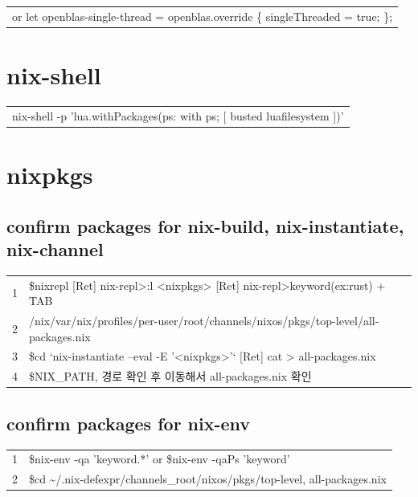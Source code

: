 \documentclass[a4paper,11pt]{article}
\begin{document}
\begin{center}
\begin{tabular}{l}
or let openblas-single-thread = openblas.override \{ singleThreaded = true; \};\\
\end{tabular}
\end{center}
\section*{nix-shell}
\label{sec:orgf3c9559}
\begin{center}
\begin{tabular}{l}
nix-shell -p 'lua.withPackages(ps: with ps; [ busted luafilesystem ])'\\
\end{tabular}
\end{center}

\section*{nixpkgs}
\label{sec:orgce0b0b2}
\subsection*{confirm packages for nix-build, nix-instantiate, nix-channel}
\label{sec:org4704e1b}
\begin{center}
\begin{tabular}{rl}
1 & \$nixrepl [Ret] nix-repl>:l <nixpkgs> [Ret] nix-repl>keyword(ex:rust) + TAB\\
2 & /nix/var/nix/profiles/per-user/root/channels/nixos/pkgs/top-level/all-packages.nix\\
3 & \$cd `nix-instantiate --eval -E '<nixpkgs>'` [Ret] cat > all-packages.nix\\
4 & \$NIX\_PATH, 경로 확인 후 이동해서 all-packages.nix 확인\\
\end{tabular}
\end{center}

\subsection*{confirm packages for nix-env}
\label{sec:org8102f1b}
\begin{center}
\begin{tabular}{rl}
1 & \$nix-env -qa 'keyword.*' or \$nix-env -qaPs 'keyword'\\
2 & \$cd \textasciitilde{}/.nix-defexpr/channels\_root/nixos/pkgs/top-level, all-packages.nix\\
\end{tabular}
\end{center}
\end{document}
